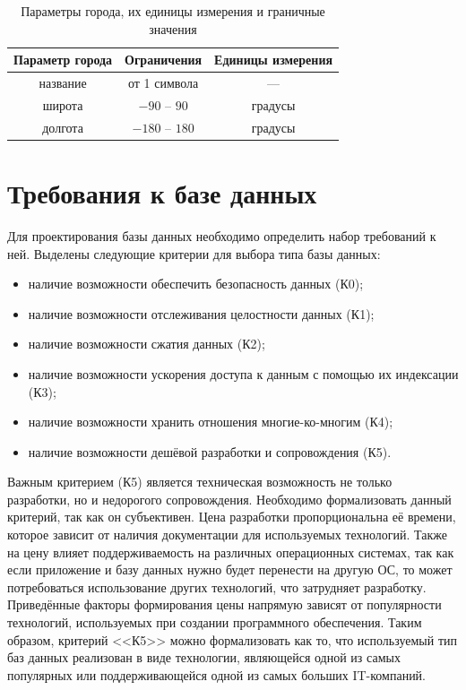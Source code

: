 \begin{table}[h!]
    \centering
    \begin{tabular}{ |c|c|c| }
        \hline
            \textbf{Параметр города} & \textbf{Ограничения} & \textbf{Единицы измерения} \\
        \hline
            название & от 1 символа & --- \\
        \hline
            широта & $-90$ -- $90$ & градусы \\
        \hline
            долгота & $-180$ -- $180$ & градусы \\
        \hline
    \end{tabular}
    \caption{\centering Параметры города, их единицы измерения и граничные значения}
    \label{table:city_parameters}
\end{table}

\section{Требования к базе данных}
Для проектирования базы данных необходимо определить набор требований к ней.
Выделены следующие критерии для выбора типа базы данных:
\begin{itemize}
    \item наличие возможности обеспечить безопасность данных (К0);
    \item наличие возможности отслеживания целостности данных (К1);
    \item наличие возможности сжатия данных (К2);
    \item наличие возможности ускорения доступа к данным с помощью их индексации (К3);
    \item наличие возможности хранить отношения многие-ко-многим (К4);
    \item наличие возможности дешёвой разработки и сопровождения (К5).
\end{itemize}

Важным критерием (К5) является техническая возможность не только разработки, но и недорогого сопровождения.
Необходимо формализовать данный критерий, так как он субъективен.
Цена разработки пропорциональна её времени, которое зависит от наличия документации для используемых технологий.
Также на цену влияет поддерживаемость на различных операционных системах, так как если приложение и базу данных нужно будет перенести на другую ОС, то может потребоваться использование других технологий, что затрудняет разработку.
Приведённые факторы формирования цены напрямую зависят от популярности технологий, используемых при создании программного обеспечения.
Таким образом, критерий <<К5>> можно формализовать как то, что используемый тип баз данных реализован в виде технологии, являющейся одной из самых популярных или поддерживающейся одной из самых больших IT-компаний.

